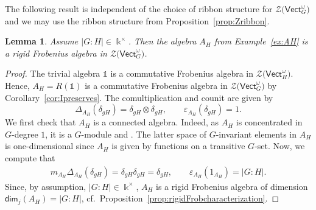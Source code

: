 \documentclass[10pt,a4paper]{amsart}
\numberwithin{equation}{section}
\newtheorem{Lemma}[Theorem]{Lemma}
\newcommand{\Hom}{\mathsf{Hom}}
\newcommand{\one}{\mathds{1}}
\renewcommand{\dim}{\mathsf{dim}}
\newcommand{\Vect}{\mathsf{Vect}}
\newcommand{\cZ}{\mathcal{Z}}
\begin{document}
The following result is independent of the choice of ribbon structure for $\cZ\big(\Vect_G^\omega\big)$ and we may use the ribbon structure from Proposition~\ref{prop:Zribbon}.
\begin{Lemma}\label{lem:AH-rigidFrob}
Assume $|G:H|\in \Bbbk^\times$. Then the algebra $A_H$ from Example~{\rm \ref{ex:AH}} is a rigid Frobenius algebra in $\cZ\big(\Vect_G^\omega\big)$.
\end{Lemma}
\begin{proof}
The trivial algebra $\one$ is a commutative Frobenius algebra in $\cZ\big(\Vect_H^\omega\big)$. Hence, ${A_H\!=\!R(\one)}$ is a commutative Frobenius algebra in $\cZ\big(\Vect_G^\omega\big)$ by Corollary~\ref{cor:Ipreserves}. The comultiplication and counit are given by
\[\Delta_{A_H}(\delta_{gH})=\delta_{gH}\otimes \delta_{gH}, \qquad \varepsilon_{A_H}(\delta_{gH})=1.\]
We first check that $A_H$ is a connected algebra. Indeed, as $A_H$ is concentrated in $G$-degree $1$, it is a $G$-module and
\smash{$\Hom_{\cZ(\Vect_G^\omega)}(\one,A_H)\subseteq (A_H)^G$}. The latter space of $G$-invariant elements in $A_H$ is one-dimensional since $A_H$ is given by functions on a transitive $G$-set.
Now, we compute that
\begin{align*}
 m_{A_H} \Delta_{A_H}(\delta_{gH})=\delta_{gH}\delta_{gH}=\delta_{gH}, \qquad \varepsilon_{A_H}(1_{A_H})=|G:H|.
\end{align*}
Since, by assumption, $|G:H|\in \Bbbk^\times$, $A_H$ is a rigid Frobenius algebra of dimension $\dim_j(A_H)=|G:H|$, cf.\ Proposition~\ref{prop:rigidFrobcharacterization}.
\end{proof}
\end{document}

